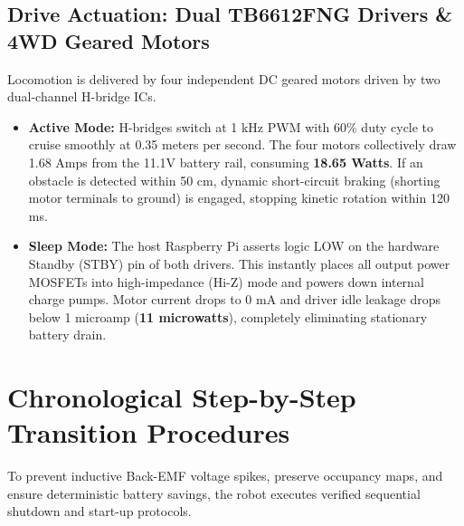 \documentclass[11pt,a4paper]{article}
\begin{document}
\subsection{Drive Actuation: Dual TB6612FNG Drivers \& 4WD Geared Motors}
Locomotion is delivered by four independent DC geared motors driven by two dual-channel H-bridge ICs.
\begin{itemize}
    \item \textbf{Active Mode:} H-bridges switch at 1 kHz PWM with 60\% duty cycle to cruise smoothly at 0.35 meters per second. The four motors collectively draw 1.68 Amps from the 11.1V battery rail, consuming \textbf{18.65 Watts}. If an obstacle is detected within 50 cm, dynamic short-circuit braking (shorting motor terminals to ground) is engaged, stopping kinetic rotation within 120 ms.
    \item \textbf{Sleep Mode:} The host Raspberry Pi asserts logic LOW on the hardware Standby (STBY) pin of both drivers. This instantly places all output power MOSFETs into high-impedance (Hi-Z) mode and powers down internal charge pumps. Motor current drops to 0 mA and driver idle leakage drops below 1 microamp (\textbf{11 microwatts}), completely eliminating stationary battery drain.
\end{itemize}

\newpage

\section{Chronological Step-by-Step Transition Procedures}

To prevent inductive Back-EMF voltage spikes, preserve occupancy maps, and ensure deterministic battery savings, the robot executes verified sequential shutdown and start-up protocols.
\end{document}
